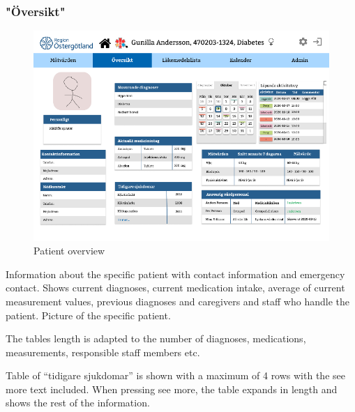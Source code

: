 \documentclass{scrreprt}
\begin{document}
\clearpage

\subsubsection{"Översikt"}
\begin{figure}[h!]
    \centering
    \includegraphics[width=15cm]{patoverview.png}
    \caption{Patient overview}
    \label{fig: patoverview}
\end{figure}
Information about the specific patient with contact information and emergency contact. Shows current diagnoses, current medication intake, average of current measurement values, previous diagnoses and caregivers and staff who handle the patient. Picture of the specific patient.

The tables length is adapted to the number of diagnoses, medications, measurements, responsible staff members etc. 

Table of “tidigare sjukdomar” is shown with a maximum of 4 rows with the see more text included. When pressing see more, the table expands in length and shows the rest of the information.


\clearpage
\end{document}
